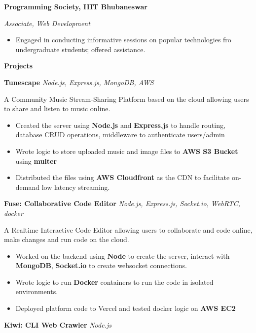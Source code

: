 \documentclass[11pt]{article}
\begin{document}
\textbf{Programming Society, IIIT Bhubaneswar } 

\textit{Associate, Web Development}

\vspace{3pt}
\begin{itemize}[noitemsep]
    \item Engaged in conducting informative sessions on popular technologies fro undergraduate students; offered assistance.
\end{itemize}

\vspace{5pt}

\begin{center}
    \textbf{Projects}
\end{center}

\textbf{Tunescape} \textit{Node.js, Express.js, MongoDB, AWS}

A Community Music Stream-Sharing Platform based on the cloud allowing users to share and listen to music online.

\begin{itemize}[noitemsep]
    
    \item Created the server using \textbf{Node.js} and \textbf{Express.js} to handle routing, database CRUD operations, middleware to authenticate users/admin
    \item Wrote logic to store uploaded music and image files to \textbf{AWS S3 Bucket} using \textbf{multer}
    \item Distributed the files using \textbf{AWS Cloudfront} as the CDN to facilitate on-demand low latency streaming.
\end{itemize}
\textbf{Fuse: Collaborative Code Editor} \textit{Node.js, Express.js, Socket.io, WebRTC, docker}

A Realtime Interactive Code Editor allowing users to collaborate and code online, make changes and run code on the cloud.

\begin{itemize}[noitemsep]
    
    \item Worked on the backend using \textbf{Node} to create the server, interact with \textbf{MongoDB}, \textbf{Socket.io} to create websocket connections.
    \item Wrote logic to run \textbf{Docker} containers to run the code in isolated environments.
    \item Deployed platform code to Vercel and tested docker logic on \textbf{AWS EC2}
\end{itemize}
\textbf{Kiwi: CLI Web Crawler} \textit{Node.js}
\end{document}
